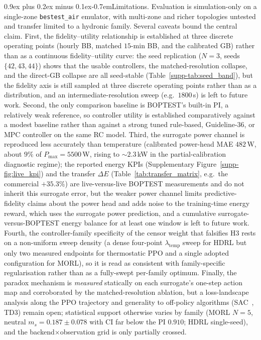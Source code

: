 \documentclass[a4paper,fleqn]{cas-sc}
\makeatletter
\renewcommand\paragraph{\@startsection{paragraph}{4}{\z@}%
 {0.9ex plus 0.2ex minus 0.1ex}{-0.7em}{\normalfont\normalsize\bfseries}}
\newcommand{\suppref}[1]{\ref{supp-#1}}
\makeatother
\begin{document}
\paragraph{Limitations.}\label{ssec:block1-limitations}\label{ssec:b3lim}
Evaluation is simulation-only on a single-zone \texttt{bestest\_air} emulator, with multi-zone and richer topologies untested and transfer limited to a hydronic family. Several caveats bound the central claim. First, the fidelity--utility relationship is established at three discrete operating points (hourly BB, matched $15$-min BB, and the calibrated GB) rather than as a continuous fidelity--utility curve: the seed replication ($N=3$, seeds $\{42,43,44\}$) shows that the usable controllers, the matched-resolution collapse, and the direct-GB collapse are all seed-stable (Table~\suppref{tab:seed_band}), but the fidelity axis is still sampled at three discrete operating points rather than as a distribution, and an intermediate-resolution sweep (e.g.\ $1800$\,s) is left to future work. Second, the only comparison baseline is BOPTEST's built-in PI, a relatively weak reference, so controller utility is established comparatively against a modest baseline rather than against a strong tuned rule-based, Guideline-36, or MPC controller on the same RC model. Third, the surrogate power channel is reproduced less accurately than temperature (calibrated power-head MAE $482$\,W, about $9\%$ of $P_{\max}=5500$\,W, rising to ${\sim}2.3$\,kW in the partial-calibration diagnostic regime); the reported energy KPIs (Supplementary Figure~\suppref{fig:live_kpi}) and the transfer $\Delta E$ (Table~\ref{tab:transfer_matrix}, e.g.\ the commercial $+35.3\%$) are live-versus-live BOPTEST measurements and do not inherit this surrogate error, but the weaker power channel limits predictive-fidelity claims about the power head and adds noise to the training-time energy reward, which uses the surrogate power prediction, and a cumulative surrogate-versus-BOPTEST energy balance for at least one window is left to future work. Fourth, the controller-family specificity of the censor weight that falsifies H3 rests on a non-uniform sweep density (a dense four-point $\lambda_{\mathrm{temp}}$ sweep for HDRL but only two measured endpoints for thermostatic PPO and a single adopted configuration for MORL), so it is read as consistent with family-specific regularisation rather than as a fully-swept per-family optimum. Finally, the paradox mechanism is \emph{measured} statically on each surrogate's one-step action map and corroborated by the matched-resolution ablation, but a loss-landscape analysis along the PPO trajectory and generality to off-policy algorithms (SAC~\citep{Haarnoja2018SAC}, TD3) remain open; statistical support otherwise varies by family (MORL $N=5$, neutral $m_s=0.187\pm0.078$ with CI far below the PI $0.910$; HDRL single-seed), and the backend$\times$observation grid is only partially crossed.
\end{document}
